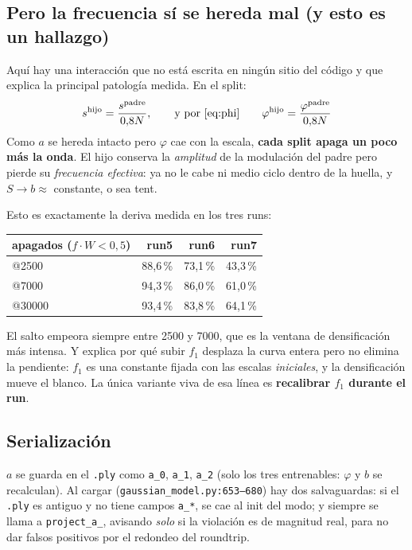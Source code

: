\documentclass[12pt]{extarticle}
\newcommand{\code}[1]{\texttt{#1}}
\begin{document}
\subsection{Pero la frecuencia sí se hereda mal (y esto es un hallazgo)}

Aquí hay una interacción que no está escrita en ningún sitio del código y que
explica la principal patología medida. En el split:
\[
s^{\text{hijo}} = \frac{s^{\text{padre}}}{0{,}8N},
\qquad\text{y por \eqref{eq:phi}}\qquad
\varphi^{\text{hijo}} = \frac{\varphi^{\text{padre}}}{0{,}8N}
\]
Como $a$ se hereda intacto pero $\varphi$ cae con la escala, \textbf{cada
split apaga un poco más la onda}. El hijo conserva la \emph{amplitud} de la
modulación del padre pero pierde su \emph{frecuencia efectiva}: ya no le cabe
ni medio ciclo dentro de la huella, y $S\to b\approx$ constante, o sea tent.

Esto es exactamente la deriva medida en los tres runs:

\begin{center}\small
\begin{tabular}{@{}lrrr@{}}
\toprule
apagados ($f\!\cdot\!W<0{,}5$) & run5 & run6 & run7 \\
\midrule
@2500  & 88,6\,\% & 73,1\,\% & 43,3\,\% \\
@7000  & 94,3\,\% & 86,0\,\% & 61,0\,\% \\
@30000 & 93,4\,\% & 83,8\,\% & 64,1\,\% \\
\bottomrule
\end{tabular}
\end{center}

El salto empeora siempre entre 2500 y 7000, que es la ventana de densificación
más intensa. Y explica por qué subir $f_1$ desplaza la curva entera pero no
elimina la pendiente: $f_1$ es una constante fijada con las escalas
\emph{iniciales}, y la densificación mueve el blanco. La única variante viva de
esa línea es \textbf{recalibrar $f_1$ durante el run}.

\subsection{Serialización}

$a$ se guarda en el \code{.ply} como \code{a\_0}, \code{a\_1}, \code{a\_2}
(solo los tres entrenables: $\varphi$ y $b$ se recalculan). Al cargar
(\code{gaussian\_model.py:653--680}) hay dos salvaguardas: si el \code{.ply} es
antiguo y no tiene campos \code{a\_*}, se cae al init del modo; y siempre se
llama a \code{project\_a\_}, avisando \emph{solo} si la violación es de
magnitud real, para no dar falsos positivos por el redondeo del roundtrip.
\end{document}
